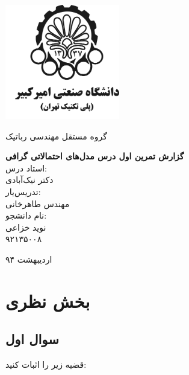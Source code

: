 \documentclass[11.5pt,a4paper]{article}
\newcommand{\nocontentsline}[3]{}
\newcommand{\tocless}[2]{\bgroup\let\addcontentsline=\nocontentsline#1{#2}\egroup}
\begin{document}
\thispagestyle{empty}
\vspace*{-28mm}
\centerline{\includegraphics[height=5cm]{logo.png}}

\begin{center}
\vspace{-2mm}
{\large
گروه مستقل مهندسی رباتیک
\\[2.1cm]
}

{\large
\textbf{گزارش تمرین اول درس مدل‌های احتمالاتی گرافی}
\\[2cm]

استاد درس:
\\[.5cm]
{\Large
دکتر نیک‌آبادی}
\\[1.5cm]
\large 
تدریس‌یار:
\\[.5cm]
{\Large
مهندس طاهرخانی}
\\[1.5cm]

\large 
نام دانشجو:
\\[.5cm]
{\Large
نوید خزاعی}
\\[.5cm]
۹۲۱۳۵۰۰۸
\\[1.5cm]
}

{\large
اردیبهشت ۹۴
}
\end{center}

\newpage
\baselineskip=1cm
\tocless\tableofcontents

\newpage
\baselineskip=0.75cm
\section{بخش نظری}
\subsection{سوال اول}
قضیه زیر را اثبات کنید: 
\begin{latin}
\end{latin}
\end{document}
